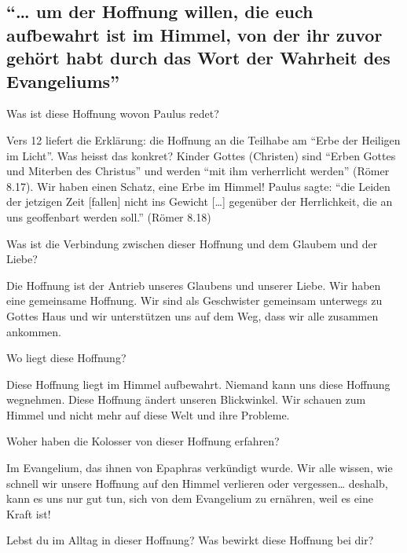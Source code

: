 \documentclass[
  12pt,
]{krantz}
\makeatletter
\newenvironment{kframe}{%
\medskip{}
\setlength{\fboxsep}{.8em}
 \def\at@end@of@kframe{}%
 \ifinner\ifhmode%
  \def\at@end@of@kframe{\end{minipage}}%
  \begin{minipage}{\columnwidth}%
 \fi\fi%
 \def\FrameCommand##1{\hskip\@totalleftmargin \hskip-\fboxsep
 \colorbox{shadecolor}{##1}\hskip-\fboxsep
     \hskip-\linewidth \hskip-\@totalleftmargin \hskip\columnwidth}%
 \MakeFramed {\advance\hsize-\width
   \@totalleftmargin\z@ \linewidth\hsize
   \@setminipage}}%
 {\par\unskip\endMakeFramed%
 \at@end@of@kframe}
\newenvironment{rmdblock}[1]
  {
  \begin{itemize}
  \renewcommand{\labelitemi}{
    \raisebox{-.7\height}[0pt][0pt]{
      {\setkeys{Gin}{width=3em,keepaspectratio}\texttt{[image: img/\#1]}}
    }
  }
  \setlength{\fboxsep}{1em}
  \begin{kframe}
  \item
  }
  {
  \end{kframe}
  \end{itemize}
  }
\newenvironment{rmdquestion}
  {\begin{rmdblock}{question}}
  {\end{rmdblock}}
\makeatother
\begin{document}
\hypertarget{um-der-hoffnung-willen-die-euch-aufbewahrt-ist-im-himmel-von-der-ihr-zuvor-gehuxf6rt-habt-durch-das-wort-der-wahrheit-des-evangeliums}{%
\subsection{``\ldots{} um der Hoffnung willen, die euch aufbewahrt ist im Himmel, von der ihr zuvor gehört habt durch das Wort der Wahrheit des Evangeliums''}\label{um-der-hoffnung-willen-die-euch-aufbewahrt-ist-im-himmel-von-der-ihr-zuvor-gehuxf6rt-habt-durch-das-wort-der-wahrheit-des-evangeliums}}

Was ist diese Hoffnung wovon Paulus redet?

Vers 12 liefert die Erklärung: die Hoffnung an die Teilhabe am ``Erbe der Heiligen im Licht''. Was heisst das konkret? Kinder Gottes (Christen) sind ``Erben Gottes und Miterben des Christus'' und werden ``mit ihm verherrlicht werden'' (Römer 8.17). Wir haben einen Schatz, eine Erbe im Himmel! Paulus sagte: ``die Leiden der jetzigen Zeit {[}fallen{]} nicht ins Gewicht {[}\ldots{]} gegenüber der Herrlichkeit, die an uns geoffenbart werden soll.'' (Römer 8.18)

Was ist die Verbindung zwischen dieser Hoffnung und dem Glaubem und der Liebe?

Die Hoffnung ist der Antrieb unseres Glaubens und unserer Liebe. Wir haben eine gemeinsame Hoffnung. Wir sind als Geschwister gemeinsam unterwegs zu Gottes Haus und wir unterstützen uns auf dem Weg, dass wir alle zusammen ankommen.

Wo liegt diese Hoffnung?

Diese Hoffnung liegt im Himmel aufbewahrt. Niemand kann uns diese Hoffnung wegnehmen. Diese Hoffnung ändert unseren Blickwinkel. Wir schauen zum Himmel und nicht mehr auf diese Welt und ihre Probleme.

Woher haben die Kolosser von dieser Hoffnung erfahren?

Im Evangelium, das ihnen von Epaphras verkündigt wurde. Wir alle wissen, wie schnell wir unsere Hoffnung auf den Himmel verlieren oder vergessen\ldots{} deshalb, kann es uns nur gut tun, sich von dem Evangelium zu ernähren, weil es eine Kraft ist!

\begin{rmdquestion}
Lebst du im Alltag in dieser Hoffnung? Was bewirkt diese Hoffnung bei
dir?
\end{rmdquestion}
\end{document}
